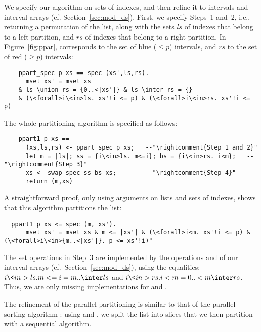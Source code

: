 \documentclass[sn-mathphys,Numbered]{sn-jnl}
\theoremstyle{thmstyleone}%
\theoremstyle{definition}%
\theoremstyle{thmstylethree}%
\begin{document}
  We specify our algorithm on sets of indexes, and then refine it to intervals and interval arrays (cf. Section~\ref{sec:mod_ds}).
  First, we specify Steps~1 and~2, i.e., returning a permutation of the list, along with the sets \is$ls$ of
  indexes that belong to a left partition, and \is$rs$ of indexes that belong to a right partition. In Figure~\ref{fig:ppar},
   corresponds to the set of blue ($\le p$) intervals, and \is$rs$ to the set of red ($\ge p$) intervals:
  \begin{lstlisting}
    ppart_spec p xs == spec (xs',ls,rs).
      mset xs' = mset xs
    & ls \union rs = {0..<|xs'|} & ls \inter rs = {}
    & (\<forall>i\<in>ls. xs'!i <= p) & (\<forall>i\<in>rs. xs'!i <= p)
  \end{lstlisting}

  The whole partitioning algorithm is specified as follows:
  \begin{lstlisting}
    ppart1 p xs ==
      (xs,ls,rs) <- ppart_spec p xs;   --"\rightcomment{Step 1 and 2}"
      let m = |ls|; ss = {i\<in>ls. m<=i}; bs = {i\<in>rs. i<m};   --"\rightcomment{Step 3}"
      xs <- swap_spec ss bs xs;        --"\rightcomment{Step 4}"
      return (m,xs)
  \end{lstlisting}
  A straightforward proof, only using arguments on lists and sets of indexes, shows that this algorithm partitions the list:
  \begin{lstlisting}
  ppart1 p xs <= spec (m, xs').
      mset xs' = mset xs & m <= |xs'| & (\<forall>i<m. xs'!i <= p) & (\<forall>i\<in>{m..<|xs'|}. p <= xs'!i)"
  \end{lstlisting}

  The set operations in Step~3 are implemented by the operations  and  of our interval arrays (cf.~Section~\ref{sec:mod_ds}),
  using the equalities: \is$ {i\<in>ls. m<=i} = {m..} \inter ls$ and \is${i\<in>rs. i<m} = {0..<m} \inter rs$.
  Thus, we are only missing implementations for  and .

  The refinement of the parallel partitioning  is similar to that of the parallel sorting algorithm :
  using  and , we split the list into slices that we then partition with a sequential algorithm.
\end{document}
